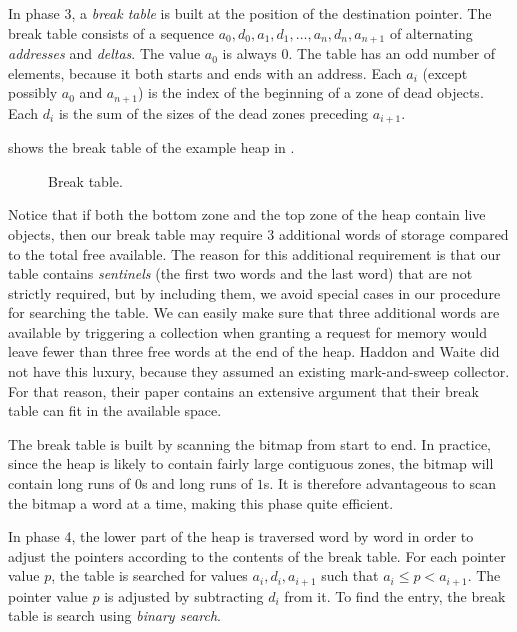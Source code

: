 In phase 3, a \emph{break table} is built at the position of the
destination pointer.  The break table consists of a sequence $a_0,
d_0, a_1, d_1, \ldots, a_n, d_n, a_{n+1}$ of alternating
\emph{addresses} and \emph{deltas}.  The value $a_0$ is always $0$.
The table has an odd number of elements, because it both starts and
ends with an address.  Each $a_i$ (except possibly $a_0$ and
$a_{n+1}$) is the index of the beginning of a zone of dead objects.
Each $d_i$ is the sum of the sizes of the dead zones preceding
$a_{i+1}$.

 shows the break table of the example heap in
.

\begin{figure}
\begin{center}
\end{center}
\caption{\label{fig-example-d}
Break table.}
\end{figure}

Notice that if both the bottom zone and the top zone of the heap
contain live objects, then our break table may require $3$ additional
words of storage compared to the total free available.  The reason for
this additional requirement is that our table contains
\emph{sentinels} (the first two words and the last word) that are not
strictly required, but by including them, we avoid special cases in
our procedure for searching the table.  We can easily make sure that
three additional words are available by triggering a collection when
granting a request for memory would leave fewer than three free words
at the end of the heap.  Haddon and Waite \cite{Haddon:1967} did not
have this luxury, because they assumed an existing mark-and-sweep
collector.  For that reason, their paper contains an extensive
argument that their break table can fit in the available space. 

The break table is built by scanning the bitmap from start to end.  In
practice, since the heap is likely to contain fairly large contiguous
zones, the bitmap will contain long runs of $0$s and long runs of
$1$s.  It is therefore advantageous to scan the bitmap a word at a
time, making this phase quite efficient. 

In phase 4, the lower part of the heap is traversed word by word in
order to adjust the pointers according to the contents of the break
table.  For each pointer value $p$, the table is searched for values 
$a_i, d_i, a_{i+1}$ such that $a_i \le p < a_{i+1}$.  The
pointer value $p$ is adjusted by subtracting $d_i$ from it.  To find
the entry, the break table is search using \emph{binary search}.

